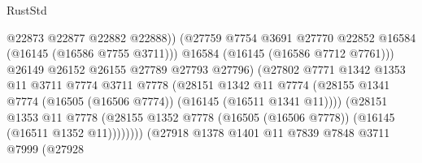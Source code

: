 \begin{lexlean}{RustStd}
\begin{coremodule}
                                            @22873
                                            @22877
                                            @22882
                                            @22888))
                                        (@27759
                                          @7754
                                          @3691
                                          @27770
                                          @22852
                                          @16584
                                          (@16145 (@16586 @7755 @3711)))
                                        @16584
                                        (@16145 (@16586 @7712 @7761)))
                                      @26149
                                      @26152
                                      @26155
                                      @27789
                                      @27793
                                      @27796)
                                    (@27802
                                      @7771
                                      @1342
                                      @1353
                                      @11
                                      @3711
                                      @7774
                                      @3711
                                      @7778
                                      (@28151
                                        @1342
                                        @11
                                        @7774
                                        (@28155
                                          @1341
                                          @7774
                                          (@16505 (@16506 @7774))
                                          (@16145 (@16511 @1341 @11))))
                                      (@28151
                                        @1353
                                        @11
                                        @7778
                                        (@28155
                                          @1352
                                          @7778
                                          (@16505 (@16506 @7778))
                                          (@16145 (@16511 @1352 @11))))))))
                              (@27918
                                @1378
                                @1401
                                @11
                                @7839
                                @7848
                                @3711
                                @7999
                                (@27928

\end{coremodule}
\end{lexlean}

